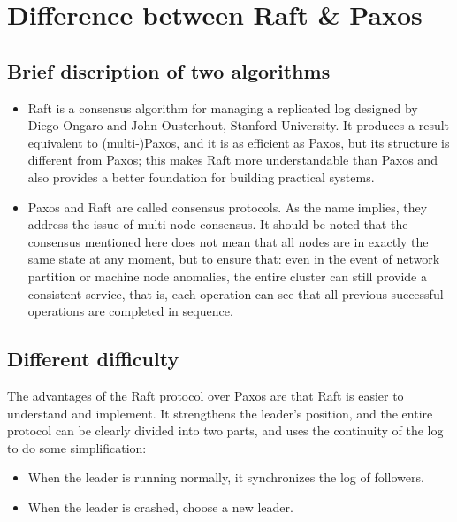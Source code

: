 \documentclass{report}
\begin{document}

\chapter{Difference between Raft \& Paxos}

\section{Brief discription of two algorithms}
\begin{itemize}
\item Raft is a consensus algorithm for managing a replicated log designed by Diego Ongaro and John Ousterhout, Stanford University. It produces a result equivalent to (multi-)Paxos, and it is as efficient as Paxos, but its structure is different from Paxos; this makes Raft more understandable than Paxos and also provides a better foundation for building practical systems.
\item Paxos and Raft are called consensus protocols. As the name implies, they address the issue of multi-node consensus. It should be noted that the consensus mentioned here does not mean that all nodes are in exactly the same state at any moment, but to ensure that: even in the event of network partition or machine node anomalies, the entire cluster can still provide a consistent service, that is, each operation can see that all previous successful operations are completed in sequence.
\end{itemize}

\section{Different difficulty}
The advantages of the Raft protocol over Paxos are that Raft is easier to understand and implement. It strengthens the leader's position, and the entire protocol can be clearly divided into two parts, and uses the continuity of the log to do some simplification:
\begin{itemize}
\item When the leader is running normally, it synchronizes the log of followers.
\item When the leader is crashed, choose a new leader.
\end{itemize}
\end{document}
